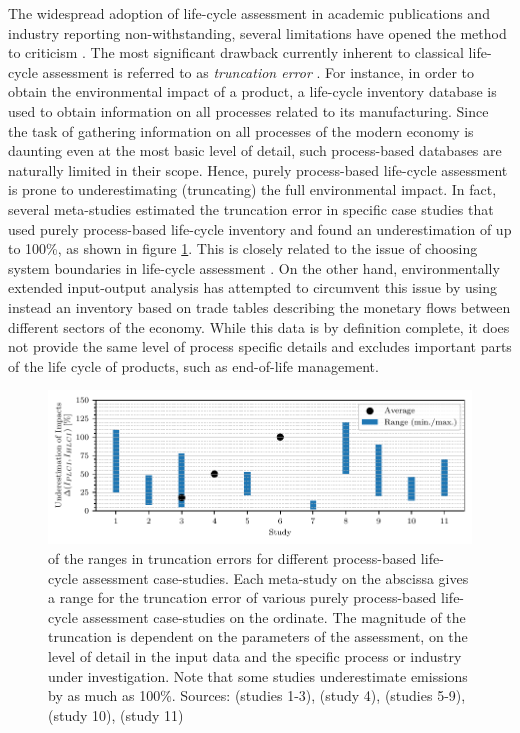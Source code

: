 \documentclass{article}
\begin{document}
    The widespread adoption of life-cycle assessment in academic publications and industry reporting non-withstanding, several limitations have opened the method to criticism \cite{reap_survey_2008}\cite{reap_survey_2008-1}\cite{finnveden_limitations_2000}\cite{plevin_using_2014}. The most significant drawback currently inherent to classical life-cycle assessment is referred to as \textit{truncation error} \cite{crawford_hybrid_2018}. For instance, in order to obtain the environmental impact of a product, a life-cycle inventory database is used to obtain information on all processes related to its manufacturing. Since the task of gathering information on all processes of the modern economy is daunting even at the most basic level of detail, such process-based databases are naturally limited in their scope. Hence, purely process-based life-cycle assessment is prone to underestimating (truncating) the full environmental impact. In fact, several meta-studies estimated the truncation error in specific case studies that used purely process-based life-cycle inventory and found an underestimation of up to 100\%, as shown in figure \ref{fig:underestimation}. This is closely related to the issue of choosing system boundaries in life-cycle assessment \cite{teh_hybrid_2017}. On the other hand, environmentally extended input-output analysis has attempted to circumvent this issue by using instead an inventory based on trade tables describing the monetary flows between different sectors of the economy. While this data is by definition complete, it does not provide the same level of process specific details and excludes important parts of the life cycle of products, such as end-of-life management.
    
    \begin{figure}[h!]
    	\centering
    	\includegraphics[width=\textwidth]{figures/underestimation.pdf}
    	\caption{ of the ranges in truncation errors for different process-based life-cycle assessment case-studies. Each meta-study on the abscissa gives a range for the truncation error of various purely process-based life-cycle assessment case-studies on the ordinate. The magnitude of the truncation is dependent on the parameters of the assessment, on the level of detail in the input data and the specific process or industry under investigation. Note that some studies underestimate emissions by as much as 100\%. Sources: \cite{rebitzer_input-output_2002} (studies 1-3), \cite{lenzen_errors_2000} (study 4), \cite{agez_hybridization_2020} (studies 5-9), \cite{agez_correcting_2022} (study 10), \cite{agez_lifting_2019} (study 11)}
    	\label{fig:underestimation}
    \end{figure}
    
\end{document}
